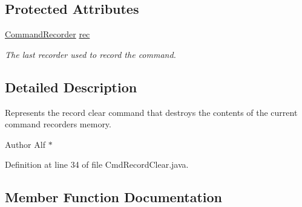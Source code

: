 \subsection*{Protected Attributes}
\begin{DoxyCompactItemize}
\item 
\hyperlink{classgov_1_1nasa_1_1jpf_1_1inspector_1_1client_1_1_command_recorder}{Command\+Recorder} \hyperlink{classgov_1_1nasa_1_1jpf_1_1inspector_1_1client_1_1_client_command_af4246f2427035c72a6af45a2c61361f7}{rec}
\begin{DoxyCompactList}\small\item\em The last recorder used to record the command. \end{DoxyCompactList}\end{DoxyCompactItemize}


\subsection{Detailed Description}
Represents the \textquotesingle{}record clear\textquotesingle{} command that destroys the contents of the current command recorder\textquotesingle{}s memory. 

\begin{DoxyAuthor}{Author}
Alf $\ast$ 
\end{DoxyAuthor}


Definition at line 34 of file Cmd\+Record\+Clear.\+java.



\subsection{Member Function Documentation}
